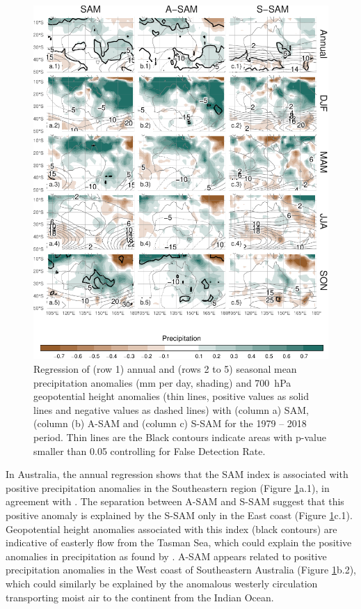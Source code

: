 \documentclass[smallextended]{svjour3}       %
\begin{document}
\begin{figure}
\includegraphics{pp-regr-oceania-1} \caption{Regression of (row 1) annual and (rows 2 to 5) seasonal mean precipitation anomalies (mm per day, shading) and 700~hPa geopotential height anomalies (thin lines, positive values as solid lines and negative values as dashed lines) with (column a) SAM, (column (b) A\nobreakdash-SAM and (column c) S\nobreakdash-SAM for the 1979 -- 2018 period. Thin lines are the Black contours indicate areas with p-value smaller than 0.05 controlling for False Detection Rate.}\label{fig:pp-regr-oceania}
\end{figure}

In Australia, the annual regression shows that the SAM index is associated with positive precipitation anomalies in the Southeastern region (Figure \ref{fig:pp-regr-oceania}a.1), in agreement with \citet{gillett2006}.
The separation between A\nobreakdash-SAM and S\nobreakdash-SAM suggest that this positive anomaly is explained by the S\nobreakdash-SAM only in the East coast (Figure \ref{fig:pp-regr-oceania}c.1).
Geopotential height anomalies associated with this index (black contours) are indicative of easterly flow from the Tasman Sea, which could explain the positive anomalies in precipitation as found by \citet{hendon2007}.
A\nobreakdash-SAM appears related to positive precipitation anomalies in the West coast of Southeastern Australia (Figure \ref{fig:pp-regr-oceania}b.2), which could similarly be explained by the anomalous westerly circulation transporting moist air to the continent from the Indian Ocean.
\end{document}
